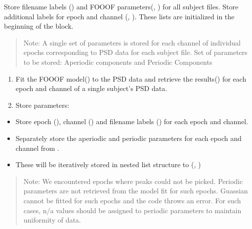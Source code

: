 \documentclass[letterpaper,10pt,english]{sphinxmanual}
\begin{document}
\sphinxAtStartPar
Store filename labels () and FOOOF parameters(, ) for all subject files. Store additional labels for epoch and channel (, ). These lists are initialized in the beginning of the block.
\begin{quote}

\sphinxAtStartPar
Note: A single set of parameters is stored for each channel of individual epochs corresponding to PSD data for each subject file. Set of parameters to be stored: Aperiodic components\sphinxhyphen{}  and Periodic Components\sphinxhyphen{} 
\end{quote}
\begin{enumerate}
%
\setcounter{enumi}{2}
\item {} 
\sphinxAtStartPar
Fit the FOOOF model() to the PSD data and retrieve the results() for each epoch and channel of a single subject’s PSD data.

\item {} 
\sphinxAtStartPar
Store parameters:

\end{enumerate}
\begin{itemize}
\item {} 
\sphinxAtStartPar
Store epoch (), channel () and filename labels () for each epoch and channel.

\item {} 
\sphinxAtStartPar
Separately store the aperiodic and periodic parameters for each epoch and channel from .

\item {} 
\sphinxAtStartPar
These will be iteratively stored in nested list structure to (, )

\end{itemize}
\begin{quote}

\sphinxAtStartPar
Note: We encountered epochs where peaks could not be picked. Periodic parameters are not retrieved from the model fit for such epochs. Guassian cannot be fitted for such epochs and the code throws an error. For such cases, n/a values should be assigned to periodic parameters to maintain uniformity of data.
\end{quote}
\end{document}
